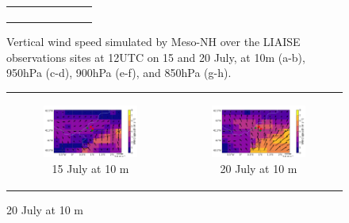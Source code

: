\begin{figure}[hbtp]
\begin{tabular}{cc}
\begin{subfigure}[t]{0.5\textwidth}
        \end{subfigure} \\
    \end{tabular}
    \caption{Vertical wind speed simulated by Meso-NH over the LIAISE observations sites at 12UTC on 15 and 20 July, at 10m (a-b), 950hPa (c-d), 900hPa (e-f), and 850hPa (g-h).}
    \label{fig:iop_days_vertwinds}
\end{figure}


\begin{figure}[hbtp]
    \centering
    \begin{tabular}{cc}
        \begin{subfigure}[t]{0.5\textwidth}
            \caption{15 July at 10 m}
            \includegraphics[width=\textwidth]{images/chap6/IOP_maps/lmdz_wind10m_2021-07-15_12UTC.png}
        \end{subfigure} &
        \begin{subfigure}[t]{0.5\textwidth}
            \caption{20 July at 10 m}
            \includegraphics[width=\textwidth]{images/chap6/IOP_maps/lmdz_wind10m_2021-07-20_12UTC.png}
        \end{subfigure} \\

\end{tabular}
\end{figure}
